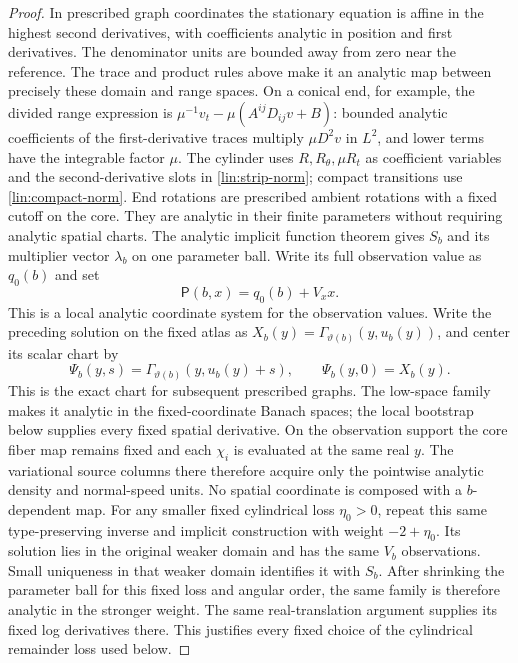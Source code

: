 \begin{proof}
In prescribed graph coordinates the stationary equation is affine in
the highest second derivatives, with coefficients analytic in position
and first derivatives.  The denominator units are bounded away from
zero near the reference.  The trace and product rules above make it an
analytic map between precisely these domain and range spaces.  On a
conical end, for example, the divided range expression is
$\mu^{-1}v_t-\mu(A^{ij}D_{ij}v+B)$: bounded analytic coefficients of
the first-derivative traces multiply $\mu D^2v$ in $L^2$, and lower
terms have the integrable factor $\mu$.  The cylinder uses
$R,R_\theta,\mu R_t$ as coefficient variables and the second-derivative
slots in \eqref{lin:strip-norm}; compact transitions use
\eqref{lin:compact-norm}.  End rotations are prescribed ambient rotations
with a fixed cutoff on the core.  They are analytic in their finite
parameters without requiring analytic spatial charts.  The analytic
implicit function theorem gives $S_b$ and its multiplier vector
$\lambda_b$ on one parameter ball.  Write its full observation value
as $q_0(b)$ and set
\begin{equation}\label{lin:flattened-observations}
 \mathsf P(b,x)=q_0(b)+V_xx.
\end{equation}
This is a local analytic coordinate system for the observation values.
Write the preceding solution on the fixed atlas as
$X_b(y)=\Gamma_{\vartheta(b)}(y,u_b(y))$, and center its scalar chart by
\begin{equation}\label{lin:centered-fiber}
 \Psi_b(y,s)=\Gamma_{\vartheta(b)}(y,u_b(y)+s),\qquad
 \Psi_b(y,0)=X_b(y).
\end{equation}
This is the exact chart for subsequent prescribed graphs.  The low-space
family makes it analytic in the fixed-coordinate Banach spaces; the local
bootstrap below supplies every fixed spatial derivative.  On the
observation support the core fiber map remains fixed and each $\chi_i$
is evaluated at the same real $y$.  The variational source columns there
therefore acquire only the pointwise analytic density and normal-speed
units.  No spatial coordinate is composed with a $b$-dependent map.
For any smaller fixed cylindrical loss $\eta_0>0$, repeat this same
type-preserving inverse and implicit construction with weight
$-2+\eta_0$.  Its solution lies in the original weaker domain and has
the same $V_b$ observations.  Small uniqueness in that weaker domain
identifies it with $S_b$.  After shrinking the parameter ball for this
fixed loss and angular order, the same family is therefore analytic in
the stronger weight.  The same real-translation argument supplies its
fixed log derivatives there.  This justifies every fixed choice of the cylindrical
remainder loss used below.


\end{proof}
